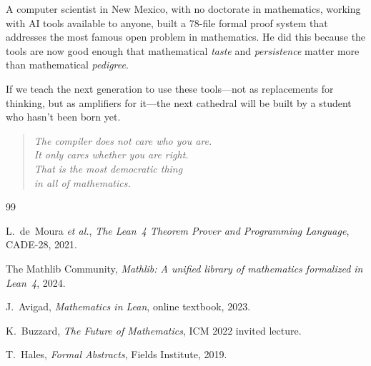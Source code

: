 \documentclass[11pt,a4paper]{article}
\begin{document}
A computer scientist in New Mexico, with no doctorate in
mathematics, working with AI tools available to anyone, built a
78-file formal proof system that addresses the most famous open
problem in mathematics. He did this because the tools are now
good enough that mathematical \emph{taste} and \emph{persistence}
matter more than mathematical \emph{pedigree}.

If we teach the next generation to use these tools---not as
replacements for thinking, but as amplifiers for it---the next
cathedral will be built by a student who hasn't been born yet.

\begin{quote}
\emph{The compiler does not care who you are.\\
It only cares whether you are right.\\
That is the most democratic thing\\
in all of mathematics.}
\end{quote}

\begin{thebibliography}{99}

L.~de~Moura \emph{et al.}, \emph{The Lean~4 Theorem Prover and
Programming Language}, CADE-28, 2021.

The Mathlib Community, \emph{Mathlib: A unified library of
mathematics formalized in Lean~4}, 2024.

J.~Avigad, \emph{Mathematics in Lean}, online textbook, 2023.

K.~Buzzard, \emph{The Future of Mathematics}, ICM 2022 invited
lecture.

T.~Hales, \emph{Formal Abstracts}, Fields Institute, 2019.

\end{thebibliography}
\end{document}
